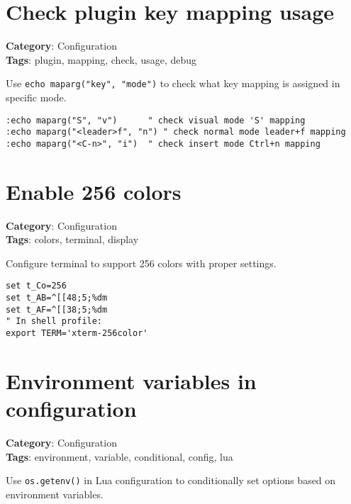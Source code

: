 {{{\section{Check plugin key mapping usage}

\textbf{Category}: Configuration\\ \textbf{Tags}: plugin, mapping, check, usage, debug
\vspace{0.5cm}

Use {\footnotesize \Verb§echo maparg("key", "mode")§} to check what key mapping is assigned in specific mode.

\begin{Exa*}{}
\begin{Verbatim}[fontsize=\footnotesize, breaklines, breakanywhere]
:echo maparg("S", "v")      " check visual mode 'S' mapping
:echo maparg("<leader>f", "n") " check normal mode leader+f mapping  
:echo maparg("<C-n>", "i")  " check insert mode Ctrl+n mapping
\end{Verbatim}
\end{Exa*}

\section{Enable 256 colors}

\textbf{Category}: Configuration\\ \textbf{Tags}: colors, terminal, display
\vspace{0.5cm}

Configure terminal to support 256 colors with proper settings.

\begin{Exa*}{}
\begin{Verbatim}[fontsize=\footnotesize, breaklines, breakanywhere]
set t_Co=256
set t_AB=^[[48;5;%dm
set t_AF=^[[38;5;%dm
" In shell profile:
export TERM='xterm-256color'
\end{Verbatim}
\end{Exa*}

\section{Environment variables in configuration}

\textbf{Category}: Configuration\\ \textbf{Tags}: environment, variable, conditional, config, lua
\vspace{0.5cm}

Use {\footnotesize \Verb§os.getenv()§} in Lua configuration to conditionally set options based on environment variables.

}}}
